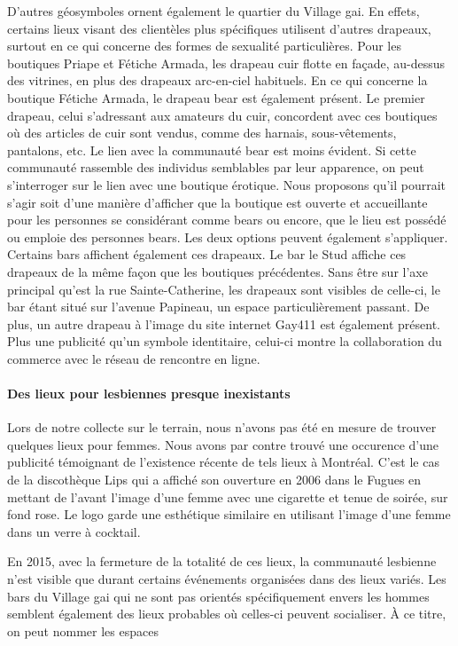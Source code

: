 D'autres géosymboles \lgbt{} ornent également le quartier du Village gai.
En effets, certains lieux visant des clientèles plus spécifiques utilisent d'autres drapeaux, surtout en ce qui concerne des formes de sexualité particulières.
Pour les boutiques Priape et Fétiche Armada, les drapeau cuir flotte en façade, au-dessus des vitrines, en plus des drapeaux arc-en-ciel habituels.
En ce qui concerne la boutique Fétiche Armada, le drapeau bear est également présent.
Le premier drapeau, celui s'adressant aux amateurs du cuir, concordent avec ces boutiques où des articles de cuir sont vendus, comme des harnais, sous-vêtements, pantalons, etc.
Le lien avec la communauté bear est moins évident.
Si cette communauté rassemble des individus semblables par leur apparence, on peut s'interroger sur le lien avec une boutique érotique.
Nous proposons qu'il pourrait s'agir soit d'une manière d'afficher que la boutique est ouverte et accueillante pour les personnes se considérant comme bears ou encore, que le lieu est possédé ou emploie des personnes bears.
Les deux options peuvent également s'appliquer.
Certains bars affichent également ces drapeaux.
Le bar le Stud affiche ces drapeaux de la même façon que les boutiques précédentes.
Sans être sur l'axe principal qu'est la rue Sainte-Catherine, les drapeaux sont visibles de celle-ci, le bar étant situé sur l'avenue Papineau, un espace particulièrement passant.
De plus, un autre drapeau à l'image du site internet Gay411 est également présent.
Plus une publicité qu'un symbole identitaire, celui-ci montre la collaboration du commerce avec le réseau de rencontre en ligne.

\paragraph{Des lieux pour lesbiennes presque inexistants}
Lors de notre collecte sur le terrain, nous n'avons pas été en mesure de trouver quelques lieux pour femmes.
Nous avons par contre trouvé une occurence d'une publicité témoignant de l'existence récente de tels lieux à Montréal.
C'est le cas de la discothèque Lips qui a affiché son ouverture en 2006 dans le Fugues en mettant de l'avant l'image d'une femme avec une cigarette et tenue de soirée, sur fond rose.
Le logo garde une esthétique similaire en utilisant l'image d'une femme dans un verre à cocktail.

En 2015, avec la fermeture de la totalité de ces lieux, la communauté lesbienne n'est visible que durant certains événements organisées dans des lieux variés.
Les bars du Village gai qui ne sont pas orientés spécifiquement envers les hommes semblent également des lieux probables où celles-ci peuvent socialiser.
À ce titre, on peut nommer les espaces 

